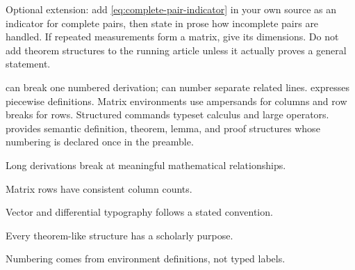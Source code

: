 
\chapterproject

\begin{miniproject}
Optional extension: add \cref{eq:complete-pair-indicator} in your own source as
an indicator for complete pairs, then state in prose how incomplete pairs are
handled. If repeated measurements form a matrix, give its dimensions. Do not
add theorem structures to the running article unless it actually proves a
general statement.
\end{miniproject}

\chaptersummary

 can break one numbered derivation;  can number
separate related lines.  expresses piecewise definitions. Matrix
environments use ampersands for columns and row breaks for rows. Structured
commands typeset calculus and large operators.  provides semantic
definition, theorem, lemma, and proof structures whose numbering is declared
once in the preamble.

\chaptercheck
\begin{chapterchecklist}
  \item Long derivations break at meaningful mathematical relationships.
  \item Matrix rows have consistent column counts.
  \item Vector and differential typography follows a stated convention.
  \item Every theorem-like structure has a scholarly purpose.
  \item Numbering comes from environment definitions, not typed labels.
\end{chapterchecklist}

